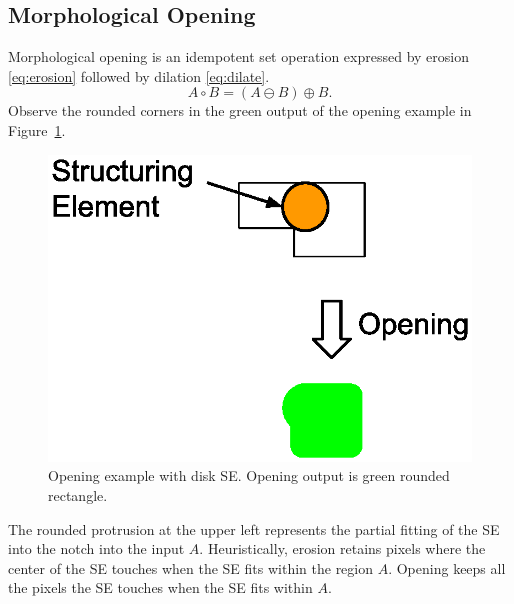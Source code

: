 \subsection{Morphological Opening}
Morphological opening is an idempotent set operation expressed by erosion \eqref{eq:erosion} followed by dilation \eqref{eq:dilate}.
\begin{equation}\label{eq:open}
A \circ B = \left(A \ominus B \right) \oplus B.
\end{equation}
Observe the rounded corners in the green output of the opening example in Figure~\ref{fig:opening}.
\begin{figure}\centering
    \includegraphics[width=0.7\linewidth,trim=70 20 50 50,clip]{gfx/open}
    \caption{Opening example with disk SE. Opening output is green rounded rectangle.}\label{fig:opening}
\end{figure}
The rounded protrusion at the upper left represents the partial fitting of the SE into the notch into the input $A$.
Heuristically, erosion retains pixels where the center of the SE touches when the SE fits within the region $A$.
Opening keeps all the pixels the SE touches when the SE fits within $A$.

